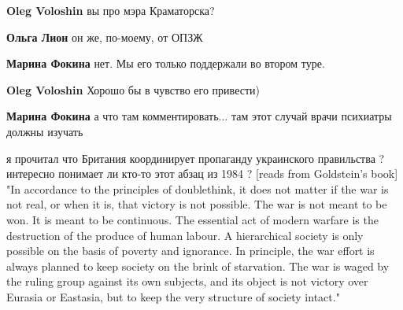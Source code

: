 \begin{itemize}
\begin{itemize}
\textbf{Oleg Voloshin} вы про мэра Краматорска?

 
\textbf{Ольга Лион} он же, по-моему, от ОПЗЖ

 
\textbf{Марина Фокина} нет. Мы его только поддержали во втором туре.

 
\textbf{Oleg Voloshin} Хорошо бы в чувство его привести)

 
\textbf{Марина Фокина} а что там комментировать... там этот случай врачи психиатры должны изучать \Smiley[1.0][yellow]
\end{itemize}

 

я прочитал что Британия координирует пропаганду украинского правильства ?
интересно понимает ли кто-то этот абзац из 1984 ? [reads from Goldstein's book]
"In accordance to the principles of doublethink, it does not matter if the war
is not real, or when it is, that victory is not possible. The war is not meant
to be won. It is meant to be continuous. The essential act of modern warfare is
the destruction of the produce of human labour. A hierarchical society is only
possible on the basis of poverty and ignorance. In principle, the war effort is
always planned to keep society on the brink of starvation. The war is waged by
the ruling group against its own subjects, and its object is not victory over
Eurasia or Eastasia, but to keep the very structure of society intact." 


\end{itemize}
